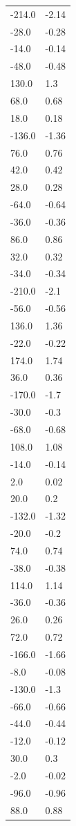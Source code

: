\begin{longtable}{ll}
-214.0 & -2.14 \\
-28.0 & -0.28 \\
-14.0 & -0.14 \\
-48.0 & -0.48 \\
130.0 & 1.3 \\
68.0 & 0.68 \\
18.0 & 0.18 \\
-136.0 & -1.36 \\
76.0 & 0.76 \\
42.0 & 0.42 \\
28.0 & 0.28 \\
-64.0 & -0.64 \\
-36.0 & -0.36 \\
86.0 & 0.86 \\
32.0 & 0.32 \\
-34.0 & -0.34 \\
-210.0 & -2.1 \\
-56.0 & -0.56 \\
136.0 & 1.36 \\
-22.0 & -0.22 \\
174.0 & 1.74 \\
36.0 & 0.36 \\
-170.0 & -1.7 \\
-30.0 & -0.3 \\
-68.0 & -0.68 \\
108.0 & 1.08 \\
-14.0 & -0.14 \\
2.0 & 0.02 \\
20.0 & 0.2 \\
-132.0 & -1.32 \\
-20.0 & -0.2 \\
74.0 & 0.74 \\
-38.0 & -0.38 \\
114.0 & 1.14 \\
-36.0 & -0.36 \\
26.0 & 0.26 \\
72.0 & 0.72 \\
-166.0 & -1.66 \\
-8.0 & -0.08 \\
-130.0 & -1.3 \\
-66.0 & -0.66 \\
-44.0 & -0.44 \\
-12.0 & -0.12 \\
30.0 & 0.3 \\
-2.0 & -0.02 \\
-96.0 & -0.96 \\
88.0 & 0.88 \\

\end{longtable}
